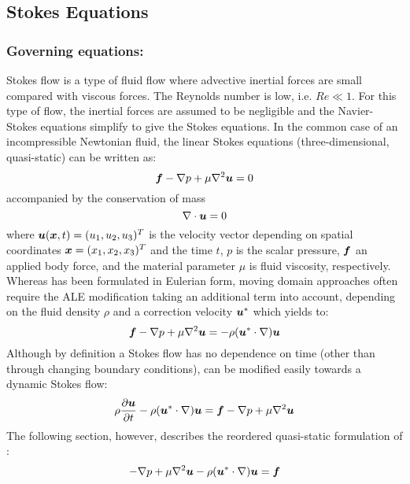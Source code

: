\subsection{Stokes Equations}

\subsubsection{Governing equations:}

Stokes flow is a type of fluid flow where advective inertial forces are small compared with viscous forces. The Reynolds number is low, i.e. $\textit{Re}\ll 1$. For this type of flow, the inertial forces are assumed to be negligible and the Navier-Stokes equations simplify to give the Stokes equations. In the common case of an incompressible Newtonian fluid, the linear Stokes equations (three-dimensional, quasi-static) can be written as:
\begin{equation}
    \vect{f}-\grad{p}+\mu\laplacian{\vect{u}}=0
  \label{eqn:Stokesequation1}
\end{equation}
accompanied by the conservation of mass
\begin{equation}
  \diverg{\vect{u}}=0
  \label{eqn:Stokesmasequation}
\end{equation}
where $\vect{u}(\vect{x},t)=(u_1,u_2,u_3)^T$ is the velocity vector depending on spatial coordinates $\vect{x}=(x_1,x_2,x_3)^T$ and the time $t$, $p$ is the scalar pressure, $\vect{f}$ an applied body force, and the material parameter $\mu$ is fluid viscosity, respectively. Whereas  has been formulated in Eulerian form, moving domain approaches often require the ALE modification taking an additional term into account, depending on the fluid density $\rho$ and a correction velocity $\vect{u}^*$ which yields to:
\begin{equation}
    \vect{f}-\grad{p}+\mu\laplacian{\vect{u}}=-\rho(\vect{u}^*\cdot\grad)\vect{u}
  \label{eqn:StokesequationALE}
\end{equation}
Although by definition a Stokes flow has no dependence on time (other than through changing boundary conditions),  can be modified easily towards a dynamic Stokes flow:
\begin{equation}
    \rho\delby{\vect{u}}{t}-\rho(\vect{u}^*\cdot\grad)\vect{u}=\vect{f}-\grad{p}+\mu\laplacian{\vect{u}}
  \label{eqn:Stokesequation2}
\end{equation}
The following section, however, describes the reordered quasi-static formulation of  :
\begin{equation}
    -\grad{p}+\mu\laplacian{\vect{u}}-\rho(\vect{u}^*\cdot\grad)\vect{u}=\vect{f}
  \label{eqn:StokesequationALE2}
\end{equation}

